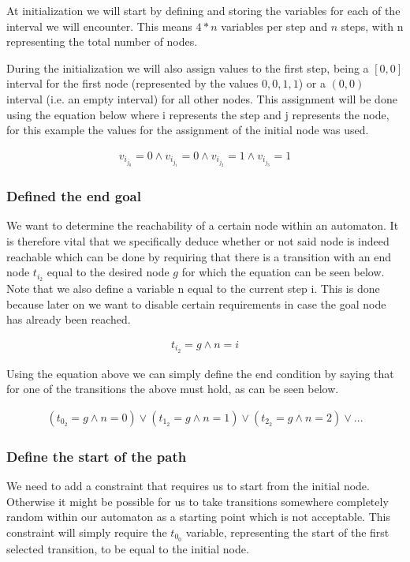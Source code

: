 \documentclass[12pt]{article}
\begin{document}
At initialization we will start by defining and storing the variables for each of the interval we will encounter. This means $4 * n$ variables per step and $n$ steps, with n representing the total number of nodes. 

During the initialization we will also assign values to the first step, being a $[0, 0]$ interval for the first node (represented by the values $0, 0, 1, 1$) or a $(0, 0)$ interval (i.e. an empty interval) for all other nodes. This assignment will be done using the equation below where i represents the step and j represents the node, for this example the values for the assignment of the initial node was used.

\begin{gather*}
	v_{i_{j_0}} = 0 \land v_{i_{j_1}} = 0 \land v_{i_{j_2}} = 1 \land v_{i_{j_3}} = 1
\end{gather*}

\subsubsection{Defined the end goal}
We want to determine the reachability of a certain node within an automaton. It is therefore vital that we specifically deduce whether or not said node is indeed reachable which can be done by requiring that there is a transition with an end node $t_{i_2}$ equal to the desired node $g$ for which the equation can be seen below. Note that we also define a variable n equal to the current step i. This is done because later on we want to disable certain requirements in case the goal node has already been reached.

\begin{gather*}
	t_{i_2} = g \land n = i
\end{gather*}

Using the equation above we can simply define the end condition by saying that for one of the transitions the above must hold, as can be seen below.

\begin{gather*}
	(t_{0_2} = g \land n = 0) \lor (t_{1_2} = g \land n = 1) \lor (t_{2_2} = g \land n = 2) \lor ...
\end{gather*}

\subsubsection{Define the start of the path}
We need to add a constraint that requires us to start from the initial node. Otherwise it might be possible for us to take transitions somewhere completely random within our automaton as a starting point which is not acceptable. This constraint will simply require the $t_{0_0}$ variable, representing the start of the first selected transition, to be equal to the initial node.
\end{document}
